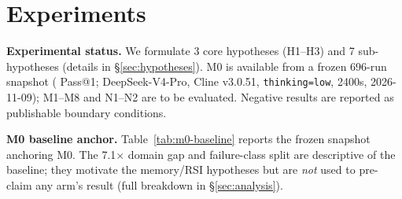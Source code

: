 \section{Experiments}
\label{sec:experiments}

{\sloppy \textbf{Experimental status.} We formulate 3 core hypotheses (H1--H3) and 7 sub-hypotheses (details in \S\ref{sec:hypotheses}). M0 is available from a frozen 696-run snapshot (\MzeroPass{} Pass@1; DeepSeek-V4-Pro, Cline v3.0.51, \texttt{thinking=low}, 2400s, 2026-11-09); M1--M8 and N1--N2 are to be evaluated. Negative results are reported as publishable boundary conditions.\par}

\textbf{M0 baseline anchor.} Table~\ref{tab:m0-baseline} reports the frozen snapshot anchoring M0. The 7.1$\times$ domain gap and failure-class split are descriptive of the baseline; they motivate the memory/RSI hypotheses but are \emph{not} used to pre-claim any arm's result (full breakdown in \S\ref{sec:analysis}).

